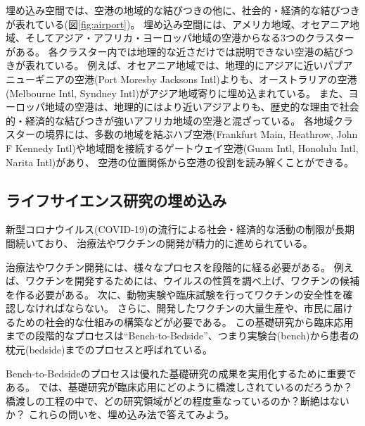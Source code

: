 \documentclass[12pt]{jarticle}
\begin{document}
埋め込み空間では、空港の地域的な結びつきの他に、社会的・経済的な結びつきが表れている(図\ref{fig:airport})。
埋め込み空間には、アメリカ地域、オセアニア地域、そしてアジア・アフリカ・ヨーロッパ地域の空港からなる3つのクラスターがある。
各クラスター内では地理的な近さだけでは説明できない空港の結びつきが表れている。
例えば、オセアニア地域では、地理的にアジアに近いパプアニューギニアの空港(Port Moresby Jacksons Intl)よりも、オーストラリアの空港(Melbourne Intl, Syndney Intl)がアジア地域寄りに埋め込まれている。
また、ヨーロッパ地域の空港は、地理的にはより近いアジアよりも、歴史的な理由で社会的・経済的な結びつきが強いアフリカ地域の空港と混ざっている。
各地域クラスターの境界には、多数の地域を結ぶハブ空港(Frankfurt Main, Heathrow, John F Kennedy Intl)や地域間を接続するゲートウェイ空港(Guam Intl, Honolulu Intl, Narita Intl)があり、
空港の位置関係から空港の役割を読み解くことができる。

\subsection{ライフサイエンス研究の埋め込み}

新型コロナウイルス(COVID-19)の流行による社会・経済的な活動の制限が長期間続いており、
治療法やワクチンの開発が精力的に進められている。

治療法やワクチン開発には、様々なプロセスを段階的に経る必要がある。
例えば、ワクチンを開発するためには、ウイルスの性質を調べ上げ、ワクチンの候補を作る必要がある。
次に、動物実験や臨床試験を行ってワクチンの安全性を確認しなければならない。
さらに、開発したワクチンの大量生産や、市民に届けるための社会的な仕組みの構築などが必要である。
この基礎研究から臨床応用までの段階的なプロセスは``Bench-to-Bedside''、つまり実験台(bench)から患者の枕元(bedside)までのプロセスと呼ばれている。

Bench-to-Bedsideのプロセスは優れた基礎研究の成果を実用化するために重要である。
では、基礎研究が臨床応用にどのように橋渡しされているのだろうか？
橋渡しの工程の中で、どの研究領域がどの程度重なっているのか？断絶はないか？
これらの問いを、埋め込み法で答えてみよう。
\end{document}
